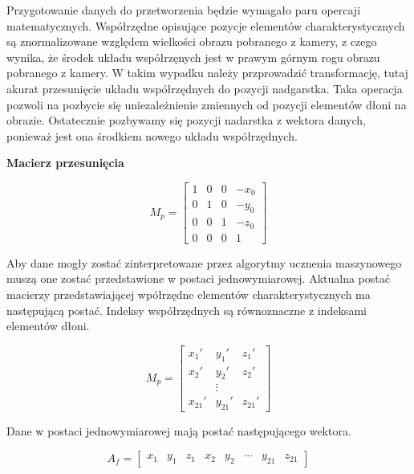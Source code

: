     \quad Przygotowanie danych do przetworzenia będzie wymagało paru opercaji matematycznych. Współrzędne opisujące pozycje elementów charakterystycznych są znormalizowane względem wielkości obrazu pobranego z kamery, z czego wynika, że środek układu współrzęnych jest w prawym górnym rogu obrazu pobranego z kamery. W takim wypadku należy przprowadzić transformację, tutaj akurat przesunięcie układu współrzędnych do pozycji nadgarstka. Taka operacja pozwoli na pozbycie się uniezależnienie zmiennych od pozycji elementów dłoni na obrazie. Ostatecznie pozbywamy się pozycji nadarstka z wektora danych, ponieważ jest ona środkiem nowego układu współrzędnych. 
    
    \quad \textbf{Macierz przesunięcia}
    
    \begin{equation*}
        M_p = 
        \begin{bmatrix}
        1 & 0 & 0 & -x_0 \\
        0 & 1 & 0 & -y_0 \\
        0 & 0 & 1 & -z_0 \\
        0 & 0 & 0 & 1
        \end{bmatrix}
    \end{equation*}
    
    \quad Aby dane mogły zostać zinterpretowane przez algorytmy ucznenia maszynowego muszą one zostać przedstawione w postaci jednowymiarowej. Aktualna postać macierzy przedstawiającej wpółrzędne elementów charakterystycznych ma następującą postać. Indeksy współrzędnych są równoznaczne z indeksami elementów dłoni. 
    
    \begin{equation*}
        M_p = 
        \begin{bmatrix}
        x_1' & y_1' & z_1' \\
        x_2' & y_2' & z_2' \\
         & \vdots &     \\
        x_{21}' & y_{21}' & z_{21}'
        \end{bmatrix}
    \end{equation*}
    
    Dane w postaci jednowymiarowej mają postać następującego wektora. 
    
    \begin{equation*}
        A_f=
        \begin{bmatrix}
            x_1 & y_1 & z_1 & x_2 & y_2 & \cdots & y_{21} & z_{21}
        \end{bmatrix}
    \end{equation*}
    
